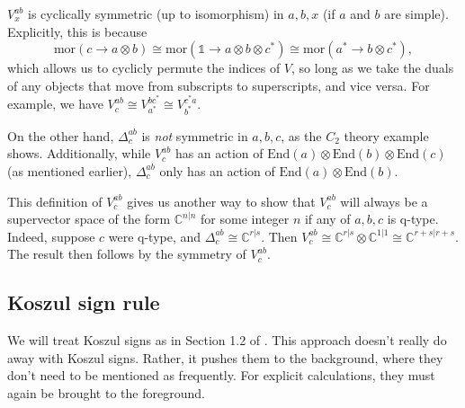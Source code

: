 \documentclass[12pt,a4paper]{article}
\newcounter{arrow}
\newcommand{\tp}{\otimes}
\newcommand{\ra}{\rightarrow}
\newcommand{\unit}{\mathds{1}}
\newcommand{\cc}{\mathbb{C}}
\newcommand\be            {\begin{equation}}
\newcommand\ee            {\end{equation}}
\newcommand{\mor}{\text{mor}}
\newcommand{\End}{\text{End}}
\newcommand{\kw}[1]{{\color{kwcolor}\footnotesize{(KW) #1}}}
\begin{document}
$V^{ab}_x$ is cyclically symmetric (up to isomorphism) in $a,b,x$ (if $a$ and $b$ are simple).
Explicitly, this is because 
\be \mor(c \ra a\tp b) \cong \mor(\unit \ra a\tp b \tp c^*) \cong \mor(a^* \ra b\tp c^*),\ee 
which allows us to cyclicly permute the indices of $V$, so long as we take the duals of any objects that move from subscripts to superscripts, and vice versa. 
For example, we have $V^{ab}_c \cong V^{bc^*}_{a^*} \cong V^{c^*a}_{b^*}$. 

On the other hand, $\Delta^{ab}_c$ is {\it not} symmetric in $a,b,c$, as the $C_2$ theory example shows. 
Additionally, while $V^{ab}_c$ has an action of $\End(a)\otimes\End(b)\otimes\End(c)$ (as mentioned earlier), $\Delta^{ab}_c$
only has an action of $\End(a)\otimes\End(b)$.

This definition of $V^{ab}_c$ gives us another way to show that $V^{ab}_c$ will always be a supervector space of the form $\cc^{n|n}$ for some integer $n$ if any of $a,b,c$ is q-type. 
Indeed, suppose $c$ were q-type, and $\Delta^{ab}_c \cong \cc^{r|s}$. 
Then $V^{ab}_c \cong \cc^{r|s} \tp \cc^{1|1} \cong \cc^{r+s|r+s}$. 
The result then follows by the symmetry of $V^{ab}_c$. 




\subsection{Koszul sign rule} \label{koszul_signs}

We will treat Koszul signs as in Section 1.2 of \cite{deligne1999}.
This approach doesn't really do away with Koszul signs.
Rather, it pushes them to the background, where they don't need to be mentioned as frequently.
For explicit calculations, they must again be brought to the foreground.
\end{document}
